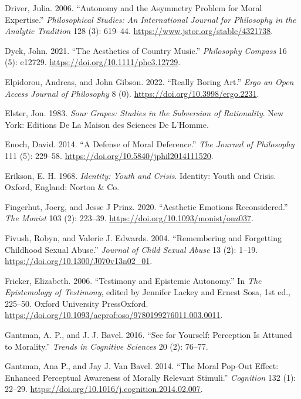 \documentclass[12pt]{book}
\newenvironment{CSLReferences}%
  {\setlength{\parindent}{0pt}%
   \setlength{\leftskip}{0pt}%
   \setlength{\parskip}{0pt}}%
  {\par}
\theoremstyle{definition}
\theoremstyle{remark}
\begin{document}
\begin{CSLReferences}{1}{0}
Driver, Julia. 2006. {``Autonomy and the {Asymmetry Problem} for {Moral Expertise}.''} \emph{Philosophical Studies: An International Journal for Philosophy in the Analytic Tradition} 128 (3): 619--44. \url{https://www.jstor.org/stable/4321738}.

Dyck, John. 2021. {``The Aesthetics of Country Music.''} \emph{Philosophy Compass} 16 (5): e12729. \url{https://doi.org/10.1111/phc3.12729}.

Elpidorou, Andreas, and John Gibson. 2022. {``Really {Boring Art}.''} \emph{Ergo an Open Access Journal of Philosophy} 8 (0). \url{https://doi.org/10.3998/ergo.2231}.

Elster, Jon. 1983. \emph{Sour {Grapes}: {Studies} in the {Subversion} of {Rationality}}. New York: Editions De La Maison des Sciences De L'Homme.

Enoch, David. 2014. {``A {Defense} of {Moral Deference}.''} \emph{The Journal of Philosophy} 111 (5): 229--58. \url{https://doi.org/10.5840/jphil2014111520}.

Erikson, E. H. 1968. \emph{Identity: Youth and Crisis}. Identity: Youth and Crisis. Oxford, England: Norton \& Co.

Fingerhut, Joerg, and Jesse J Prinz. 2020. {``Aesthetic Emotions Reconsidered.''} \emph{The Monist} 103 (2): 223--39. \url{https://doi.org/10.1093/monist/onz037}.

Fivush, Robyn, and Valerie J. Edwards. 2004. {``Remembering and {Forgetting Childhood Sexual Abuse}.''} \emph{Journal of Child Sexual Abuse} 13 (2): 1--19. \url{https://doi.org/10.1300/J070v13n02_01}.

Fricker, Elizabeth. 2006. {``Testimony and {Epistemic Autonomy}.''} In \emph{The {Epistemology} of {Testimony}}, edited by Jennifer Lackey and Ernest Sosa, 1st ed., 225--50. Oxford University PressOxford. \url{https://doi.org/10.1093/acprof:oso/9780199276011.003.0011}.

Gantman, A. P., and J. J. Bavel. 2016. {``See for Yourself: Perception Is Attuned to Morality.''} \emph{Trends in Cognitive Sciences} 20 (2): 76--77.

Gantman, Ana P., and Jay J. Van Bavel. 2014. {``The Moral Pop-Out Effect: {Enhanced} Perceptual Awareness of Morally Relevant Stimuli.''} \emph{Cognition} 132 (1): 22--29. \url{https://doi.org/10.1016/j.cognition.2014.02.007}.


\end{CSLReferences}
\end{document}
